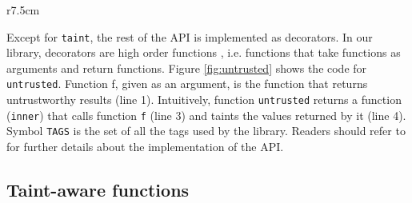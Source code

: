 \documentclass[oribibl]{llncs}
\newcommand{\nameTklass}{Taint-aware }
\begin{document}
\begin{wrapfigure}{r}{7.5cm}
\vspace{-30pt}
{\small{

\caption{\label{fig:untrusted} Code for \texttt{untrusted}}
}}
\vspace{-10pt}
\end{wrapfigure}
Except for \texttt{taint}, the rest of 
the API is implemented as decorators. In our library, 
decorators are high 
order functions \cite{IntroductionFunctional}, 
i.e. functions that take functions as arguments and return functions.
Figure \ref{fig:untrusted} shows the code for \texttt{untrusted}.
Function f, given as an argument, 
is the function that returns 
untrustworthy results (line 1). 
Intuitively, 
function \texttt{untrusted} returns
a function (\texttt{inner}) that 
calls function \texttt{f} (line 3) and taints the values 
returned by it (line 4). Symbol \texttt{TAGS} is the set of 
all the tags used by the library. 
Readers should refer to \cite{PythonLib} 
for further details about the implementation of the 
API.










\subsection{\nameTklass functions} 
\end{document}
